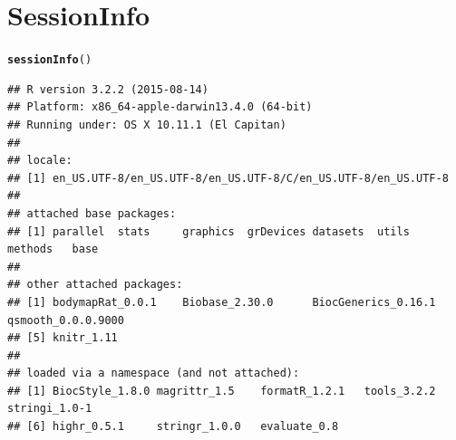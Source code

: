\documentclass{article}\usepackage[]{graphicx}\usepackage[usenames,dvipsnames]{color}
\makeatletter
\newcommand{\hlstd}[1]{\textcolor[rgb]{0.345,0.345,0.345}{#1}}%
\newcommand{\hlkwd}[1]{\textcolor[rgb]{0.737,0.353,0.396}{\textbf{#1}}}%
\newenvironment{kframe}{%
 \def\at@end@of@kframe{}%
 \ifinner\ifhmode%
  \def\at@end@of@kframe{\end{minipage}}%
  \begin{minipage}{\columnwidth}%
 \fi\fi%
 \def\FrameCommand##1{\hskip\@totalleftmargin \hskip-\fboxsep
 \colorbox{shadecolor}{##1}\hskip-\fboxsep
     \hskip-\linewidth \hskip-\@totalleftmargin \hskip\columnwidth}%
 \MakeFramed {\advance\hsize-\width
   \@totalleftmargin\z@ \linewidth\hsize
   \@setminipage}}%
 {\par\unskip\endMakeFramed%
 \at@end@of@kframe}
\newenvironment{knitrout}{}{} %
\makeatother
\begin{document}
\section{SessionInfo}

\begin{knitrout}
\color{fgcolor}\begin{kframe}
\begin{alltt}
\hlkwd{sessionInfo}\hlstd{()}
\end{alltt}
\begin{verbatim}
## R version 3.2.2 (2015-08-14)
## Platform: x86_64-apple-darwin13.4.0 (64-bit)
## Running under: OS X 10.11.1 (El Capitan)
## 
## locale:
## [1] en_US.UTF-8/en_US.UTF-8/en_US.UTF-8/C/en_US.UTF-8/en_US.UTF-8
## 
## attached base packages:
## [1] parallel  stats     graphics  grDevices datasets  utils     methods   base     
## 
## other attached packages:
## [1] bodymapRat_0.0.1    Biobase_2.30.0      BiocGenerics_0.16.1 qsmooth_0.0.0.9000 
## [5] knitr_1.11         
## 
## loaded via a namespace (and not attached):
## [1] BiocStyle_1.8.0 magrittr_1.5    formatR_1.2.1   tools_3.2.2     stringi_1.0-1  
## [6] highr_0.5.1     stringr_1.0.0   evaluate_0.8
\end{verbatim}
\end{kframe}
\end{knitrout}


\end{document}
